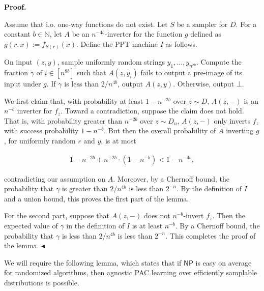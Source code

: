 \par\medskip\noindent\textbf{Proof.}\par




Assume that i.o. one-way functions do not exist. Let $S$ be a sampler for $D$. For a constant $b\in\mathbb{N}$, let $A$ be an $n^{-4b}$-inverter for the function $g$ defined as $g(r,x):=f_{S(r)}(x)$. Define the PPT machine $I$ as follows.\par



On input $(z,y)$, sample uniformly random strings $y_{1},...,y_{n^{8b}}$. Compute the fraction $\gamma$ of $i\in[n^{8b}]$ such that $A(z,y_{i})$ fails to output a pre-image of its input under $g$. If $\gamma$ is less than $2/n^{4b}$, output $A(z,y)$. Otherwise, output $\bot$.\par



We first claim that, with probability at least $1-n^{-2b}$ over $z\sim D$, $A(z,-)$ is an $n^{-b}$ inverter for $f_{z}$. Toward a contradiction, suppose the claim does not hold. That is, with probability greater than $n^{-2b}$ over $z\sim D_{n}$, $A(z,-)$ only inverts $f_{z}$ with success probability $1-n^{-b}$. But then the overall probability of $A$ inverting $g$, for uniformly random $r$ and $y$, is at most\par


\[\begin{gathered}
1-n^{-2b}+n^{-2b}\cdot(1-n^{-b})<1-n^{-4b},
\end{gathered}\]


contradicting our assumption on $A$. Moreover, by a Chernoff bound, the probability that $\gamma$ is greater than $2/n^{4b}$ is less than $2^{-n}$. By the definition of $I$ and a union bound, this proves the first part of the lemma.\par




For the second part, suppose that $A(z,-)$ does not $n^{-b}$-invert $f_{z}$. Then the expected value of $\gamma$ in the definition of $I$ is at least $n^{-b}$. By a Chernoff bound, the probability that $\gamma$ is less than $2/n^{4b}$ is less than $2^{-n}$. This completes the proof of the lemma.
$\blacktriangleleft$\par




We will require the following lemma, which states that if ${\mathsf{NP}}$ is easy on average for randomized algorithms, then agnostic PAC learning over efficiently samplable distributions is possible.\par



